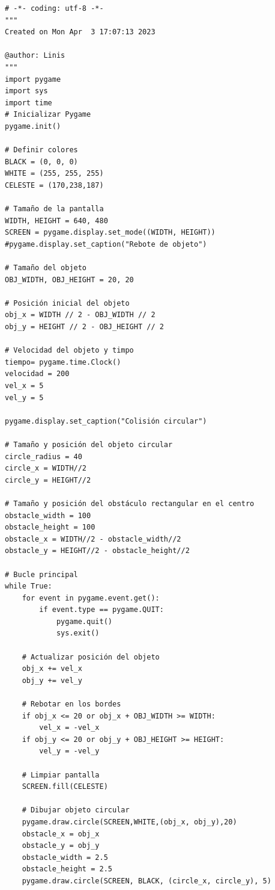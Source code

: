 {\hspace{-2.5cm}{\ttfamily \scriptsize obstáculo}

\vspace{-0.2cm}
\hspace{-2.4cm}{\ttfamily \scriptsize \_rebote.py}\vspace{-0.84cm}
\begin{lstlisting}	
# -*- coding: utf-8 -*-
"""
Created on Mon Apr  3 17:07:13 2023

@author: Linis
"""
import pygame
import sys
import time
# Inicializar Pygame
pygame.init()

# Definir colores
BLACK = (0, 0, 0)
WHITE = (255, 255, 255)
CELESTE = (170,238,187)

# Tamaño de la pantalla
WIDTH, HEIGHT = 640, 480
SCREEN = pygame.display.set_mode((WIDTH, HEIGHT))
#pygame.display.set_caption("Rebote de objeto")

# Tamaño del objeto
OBJ_WIDTH, OBJ_HEIGHT = 20, 20

# Posición inicial del objeto
obj_x = WIDTH // 2 - OBJ_WIDTH // 2
obj_y = HEIGHT // 2 - OBJ_HEIGHT // 2

# Velocidad del objeto y timpo
tiempo= pygame.time.Clock()
velocidad = 200
vel_x = 5
vel_y = 5

pygame.display.set_caption("Colisión circular")

# Tamaño y posición del objeto circular
circle_radius = 40
circle_x = WIDTH//2
circle_y = HEIGHT//2

# Tamaño y posición del obstáculo rectangular en el centro
obstacle_width = 100
obstacle_height = 100
obstacle_x = WIDTH//2 - obstacle_width//2
obstacle_y = HEIGHT//2 - obstacle_height//2

# Bucle principal
while True:
    for event in pygame.event.get():
        if event.type == pygame.QUIT:
            pygame.quit()
            sys.exit()

    # Actualizar posición del objeto
    obj_x += vel_x
    obj_y += vel_y

    # Rebotar en los bordes
    if obj_x <= 20 or obj_x + OBJ_WIDTH >= WIDTH:
        vel_x = -vel_x
    if obj_y <= 20 or obj_y + OBJ_HEIGHT >= HEIGHT:
        vel_y = -vel_y

    # Limpiar pantalla
    SCREEN.fill(CELESTE)

    # Dibujar objeto circular
    pygame.draw.circle(SCREEN,WHITE,(obj_x, obj_y),20)
    obstacle_x = obj_x
    obstacle_y = obj_y
    obstacle_width = 2.5
    obstacle_height = 2.5
    pygame.draw.circle(SCREEN, BLACK, (circle_x, circle_y), 5)
   

\end{lstlisting}}

